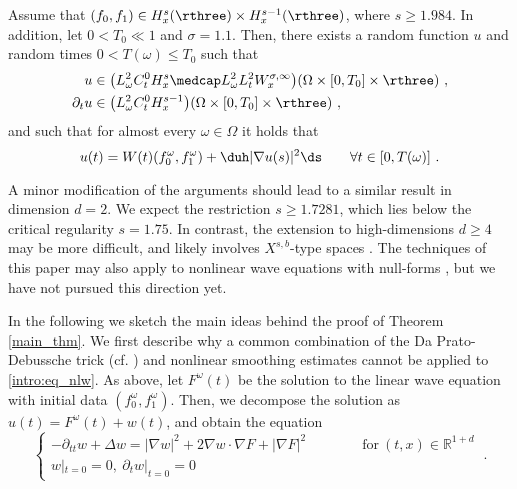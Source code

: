 \documentclass[11pt]{article}
\begin{document}
\begin{thm}\label{main_thm}
Assume that \( (f_0,f_1) \in H_x^s(\rthree)\times H_x^{s-1}(\rthree)\), where \( s \geq 1.984 \). In addition, let \( 0 < T_0 \ll 1 \) and \( \sigma=1.1 \). Then, there exists a random function \( u \) and random times \( 0 < T(\omega) \leq T_0 \) such that 
\begin{equation}\label{intro:eq_u_space}
\begin{aligned}
u&\in  \big( L_\omega^2 C_t^0 H_x^s \medcap L_\omega^2 L_t^2 W_{x}^{\sigma,\infty} \big)(\Omega \times [0,T_0] \times \rthree)~,\\
\partial_t u &\in\big( L_\omega^2 C_t^0 H_x^{s-1} \big)(\Omega \times [0,T_0] \times \rthree)~,
\end{aligned}
\end{equation}
and such that for almost every \( \omega \in \Omega \) it holds that 
\begin{equation}\label{intro:eq_u_duhamel}
u(t)= W(t) (f_0^\omega, f_1^\omega) + \duh |\nabla u(s)|^2 \ds \qquad \forall t \in [0,T(\omega)]~. 
\end{equation}
\end{thm}
\begin{rem}
A minor modification of the arguments should lead to a similar result in dimension \( d=2 \). We expect the restriction \( s \geq 1.7281 \), which lies below the critical regularity \( s=1.75 \). In contrast, the extension to high-dimensions \( d \geq 4 \) may be more difficult, and likely involves \( X^{s,b} \)-type spaces \cite{Bourgain93}. The techniques of this paper may also apply to nonlinear wave equations with null-forms \cite{KM93}, but we have not pursued this direction yet. 
\end{rem}
In the following we sketch the main ideas behind the proof of Theorem \ref{main_thm}. We first describe why a common combination of the Da Prato-Debussche trick (cf. \cite{PD02}) and nonlinear smoothing estimates cannot be applied to \eqref{intro:eq_nlw}. As above, let \( F^\omega(t) \) be the solution to the linear wave equation with initial data \( (f^\omega_0,f^\omega_1) \). Then, we decompose the solution as \( u(t)= F^\omega(t)+w(t) \), and obtain the equation
\begin{equation}\label{intro:eq_nlw_nl}
\begin{cases}
-\partial_{tt} w + \Delta w =  |\nabla w|^2 + 2 \nabla w \cdot \nabla F + |\nabla F|^2 \qquad\qquad \text{for} ~ (t,x)\in \mathbb{R}^{1+d} \\
w|_{t=0}=0, ~ \partial_t w|_{t=0}=0
\end{cases}~.
\end{equation}
\end{document}
